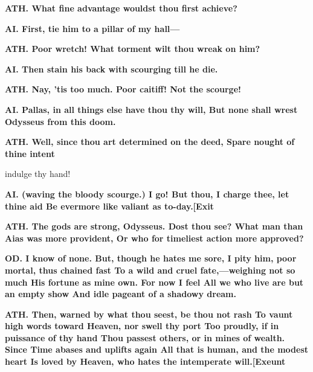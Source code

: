 \documentclass[11pt,letter]{book}
\begin{document}
\par \textbf{ATH. What fine advantage wouldst thou first achieve?}
\par 

\par \textbf{AI. First, tie him to a pillar of my hall—}
\par 

\par \textbf{ATH. Poor wretch! What torment wilt thou wreak on him?}
\par 

\par \textbf{AI. Then stain his back with scourging till he die.}
\par 

\par \textbf{ATH. Nay, ’tis too much. Poor caitiff! Not the scourge!}
\par 

\par \textbf{AI. Pallas, in all things else have thou thy will, But none shall wrest Odysseus from this doom.}
\par 

\par \textbf{ATH. Well, since thou art determined on the deed, Spare nought of thine intent}
\par   indulge thy hand!

\par \textbf{AI. (waving the bloody scourge.) I go! But thou, I charge thee, let thine aid Be evermore like valiant as to-day.[Exit}
\par 

\par \textbf{ATH. The gods are strong, Odysseus. Dost thou see? What man than Aias was more provident, Or who for timeliest action more approved?}
\par 

\par \textbf{OD. I know of none. But, though he hates me sore, I pity him, poor mortal, thus chained fast To a wild and cruel fate,—weighing not so much His fortune as mine own. For now I feel All we who live are but an empty show And idle pageant of a shadowy dream.}
\par 

\par \textbf{ATH. Then, warned by what thou seest, be thou not rash To vaunt high words toward Heaven, nor swell thy port Too proudly, if in puissance of thy hand Thou passest others, or in mines of wealth. Since Time abases and uplifts again All that is human, and the modest heart Is loved by Heaven, who hates the intemperate will.[Exeunt}
\par 
\end{document}
